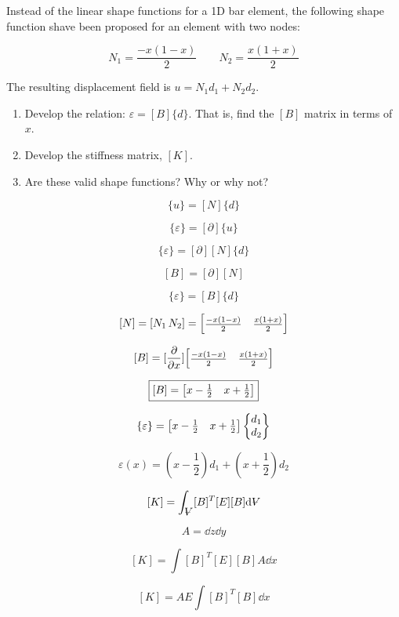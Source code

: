 \documentclass[../main.tex]{subfiles}
\begin{document}

Instead of the linear shape functions for a 1D bar element, the following shape function shave been proposed for an element with two nodes:

\[
    N_1 = \frac{-x(1-x)}{2} \quad \quad N_2 = \frac{x(1+x)}{2}
\]

The resulting displacement field is \(u = N_1d_1 + N_2d_2\).

\begin{enumerate}[label=\alph*)]
    \item Develop the relation: \(\varepsilon = [B]\{{d}\}\). That is, find the \([B]\) matrix in terms of \(x\).
    \item Develop the stiffness matrix, \([K]\).
    \item Are these valid shape functions? Why or why not?
\end{enumerate}


\solution{}

\[
    \{u\} = [N]\{d\}
\]

\[
    \{\varepsilon\} = [\partial]\{u\}
\]

\[
    \{\varepsilon\} = [\partial][N]\{d\}
\]

\[
    [B] = [\partial][N]
\]

\[
    \{\varepsilon\} = [B]\{d\}
\]

\[
    [N] = [N_1\, N_2] = \mqty[\frac{-x(1-x)}{2} & \frac{x(1+x)}{2}]
\]

\[
    [B] = [\pdv{x}]\mqty[\frac{-x(1-x)}{2} & \frac{x(1+x)}{2}]
\]

\[
    \boxed{
    [B] = \mqty[x - \frac{1}{2} & x + \frac{1}{2}]
    }
\]

\[
    \{\varepsilon\} = \mqty[x - \frac{1}{2} & x + \frac{1}{2}]
    \begin{Bmatrix}
        d_1\\d_2
    \end{Bmatrix}
\]

\[
    \varepsilon(x) = \left({x - \frac{1}{2}}\right)d_1 + \left({x + \frac{1}{2}}\right)d_2
\]


\[
    [K] = \int_\volume [B]^T [E] [B] \dd \volume
\]

\[
    A = \dd z \dd y
\]

\[
    [K] = \int [B]^T [E] [B] A \dd x
\]

\[
    [K] = AE \int [B]^T [B] \dd x
\]
\end{document}

